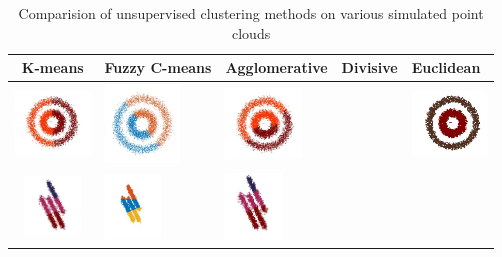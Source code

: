 \documentclass[12pt]{drexelthesis}
\begin{document}
 \begin{table}[h!]
     \begin{center}
           \caption[Comparison of Unsupervised clustering methods]{Comparision of unsupervised clustering methods on various simulated point clouds}
     \begin{tabular}{ | c | p{3cm} | p{3cm} | p{3cm} | p{3cm} | }
     \hline
      K-means & Fuzzy C-means & Agglomerative & Divisive & Euclidean \\ 
      \hline
      		\includegraphics[width=2cm]{2d-cluster-tests/k-means/concentric.jpg}
      & 
      		\includegraphics[trim={0 0 0 2cm},clip, width=2cm]{2d-cluster-tests/fcm/concentric.jpg}
      & 
      		\includegraphics[trim={0 1cm 0 1cm},clip, width=2cm]{2d-cluster-tests/agglomerative/concentric.jpg}
      &

      &
      		\includegraphics[width=2cm]{2d-cluster-tests/euclidean-distance/concentric.jpg}
      \\ \hline
      
            \includegraphics[width=1.5cm]{2d-cluster-tests/k-means/lines.jpg}
      & 
             \includegraphics[width=1.5cm]{2d-cluster-tests/fcm/lines.jpg}    
      & 
             \includegraphics[trim={0 1cm 0 0cm},clip,width=1.5cm]{2d-cluster-tests/agglomerative/lines.jpg}    
      &


\end{tabular}
\end{center}
\end{table}
\end{document}
